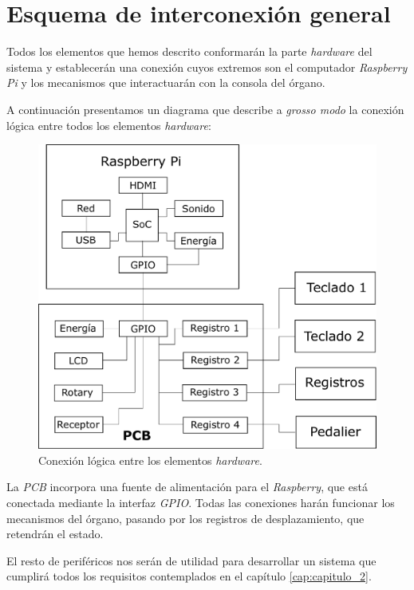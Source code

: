\section{Esquema de interconexión general}

Todos los elementos que hemos descrito conformarán la parte \textit{hardware} del sistema y establecerán una conexión cuyos extremos son el computador \textit{Raspberry Pi} y los mecanismos que interactuarán con la consola del órgano.

A continuación presentamos un diagrama que describe a \textit{grosso modo} la conexión lógica entre todos los elementos \textit{hardware}:

\smallskip

\begin{figure}[H]
	\noindent \begin{centering}
		\includegraphics[width=\linewidth*2/3]{capitulo3/hardware}
		\par\end{centering}
	\smallskip
	\caption{\label{fig:hardware} Conexión lógica entre los elementos \textit{hardware}.}
\end{figure} 

\smallskip

La \textit{PCB} incorpora una fuente de alimentación para el \textit{Raspberry}, que está conectada mediante la interfaz \textit{GPIO}. Todas las conexiones harán funcionar los mecanismos del órgano, pasando por los registros de desplazamiento, que retendrán el estado.

El resto de periféricos nos serán de utilidad para desarrollar un sistema que cumplirá todos los requisitos contemplados en el capítulo \ref{cap:capitulo_2}.

\clearpage{\cleardoublepage}
\clearpage{\pagestyle{empty}\cleardoublepage}